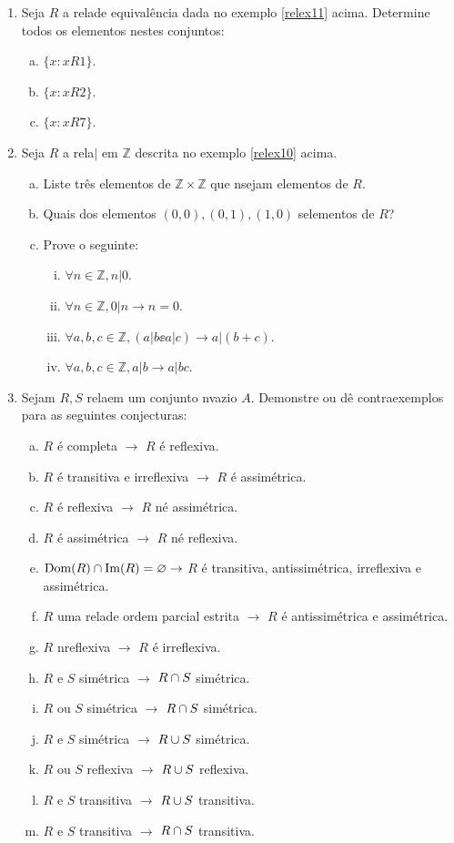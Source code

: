 \begin{enumerate}[{\bf 1.}]
\item Seja $R$ a rela\cao de equival\^encia dada no exemplo \ref{relex11} acima. Determine todos os elementos nestes conjuntos:
\begin{enumerate}[a)]
\item $\{x:xR1\}$.
\item $\{x:xR2\}$.
\item $\{x:xR7\}$.
\end{enumerate}

\item Seja $R$ a rela\cao $|$ em $\mathbb{Z}$ descrita no exemplo \ref{relex10} acima.
\begin{enumerate}[a)]
\item Liste tr\^es elementos de $\mathbb{Z}\times\mathbb{Z}$ que n\ao sejam elementos de $R$.
\item Quais dos elementos $(0,0),(0,1),(1,0)$ s\ao elementos de $R$?
\item Prove o seguinte:
\begin{enumerate}[i)]
\item $\forall n\in \mathbb{Z}, n|0$.
\item $\forall n\in \mathbb{Z}, 0|n\to n=0$.
\item $\forall a,b,c\in \mathbb{Z}, (a|b\ee a|c)\to a|(b+c)$.
\item $\forall a,b,c\in \mathbb{Z}, a|b\to a|bc$.
\end{enumerate}
\end{enumerate}

\item Sejam $R,S$ rela\coes em um conjunto n\ao vazio $A$. Demonstre ou d\^e contraexemplos para as seguintes conjecturas:
\begin{enumerate}[a)]
\item $R$ \'e completa $\to$ $R$ \'e reflexiva.
\item $R$ \'e transitiva e irreflexiva $\to$ $R$ \'e assim\'etrica.
\item $R$ \'e reflexiva $\to$ $R$ n\ao \'e assim\'etrica. 
\item $R$ \'e assim\'etrica $\to$ $R$ n\ao \'e reflexiva.
\item $\operatorname{Dom}(R)\cap \operatorname{Im}(R)=\varnothing\to$ $R$ \'e transitiva, antissim\'etrica, irreflexiva e assim\'etrica.
\item $R$ uma rela\cao de ordem parcial estrita $\to$ $R$ \'e antissim\'etrica e assim\'etrica. 
\item $R$ n\ao reflexiva $\to$ $R$ \'e irreflexiva.
\item $R$ e $S$ sim\'etrica $\to$ $R\cap S$ sim\'etrica. 
\item $R$ ou $S$ sim\'etrica $\to$ $R\cap S$ sim\'etrica.
\item $R$ e $S$ sim\'etrica $\to$ $R\cup S$ sim\'etrica.
\item $R$ ou $S$ reflexiva $\to$ $R\cup S$ reflexiva.
\item $R$ e $S$ transitiva $\to$ $R\cup S$ transitiva.
\item $R$ e $S$ transitiva $\to$ $R\cap S$ transitiva.
\end{enumerate}


\end{enumerate}
